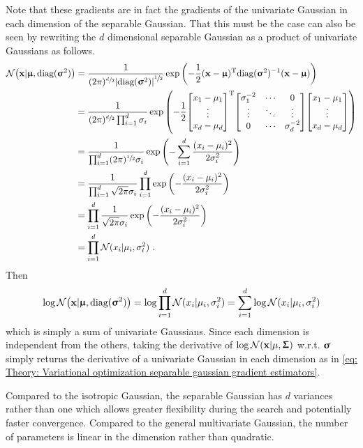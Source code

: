 Note that these gradients are in fact the gradients of the univariate Gaussian in each dimension of the separable Gaussian. That this must be the case can also be seen by rewriting the $d$ dimensional separable Gaussian as a product of univariate Gaussians as follows.
\begin{align}
    \mathcal{N}{\left({\mathbf{x}}|{\boldsymbol{\upmu}}, \text{diag}({\boldsymbol{\upsigma}}^2)\right)}
    &= \frac{1}{(2\pi)^{\sfrac{d}{2}}{\left\lvert\text{diag}({\boldsymbol{\upsigma}}^2)\right\rvert}^{\sfrac{1}{2}}}\exp{\left(-\frac{1}{2}({\mathbf{x}}-{\boldsymbol{\upmu}}){^\mathrm{T}}\text{diag}({\boldsymbol{\upsigma}}^2)^{-1}({\mathbf{x}}-{\boldsymbol{\upmu}})\right)}\nonumber\\
    &= \frac{1}{(2\pi)^{\sfrac{d}{2}}\prod_{i=1}^d \sigma_i}\exp{\left(-\frac{1}{2} 
    {\begin{bmatrix}x_1-\mu_1\\\vdots\\x_d-\mu_d\end{bmatrix}}^\text{T}
    {\begin{bmatrix}\sigma_1^{-2} & \cdots & 0\\
          \vdots        & \ddots & \vdots\\
          0             & \cdots & \sigma_d^{-2}\end{bmatrix}}
    {\begin{bmatrix}x_1-\mu_1\\\vdots\\x_d-\mu_d\end{bmatrix}}\right)}\nonumber\\
    &= \frac{1}{\prod_{i=1}^d (2\pi)^{\sfrac{1}{2}}\sigma_i}\exp{\left(-\sum_{i=1}^d\frac{(x_i-\mu_i)^2}{2\sigma_i^2}\right)}\nonumber\\
    &= \frac{1}{\prod_{i=1}^d \sqrt{2\pi}\sigma_i}\prod_{i=1}^d\exp{\left(-\frac{(x_i-\mu_i)^2}{2\sigma_i^2}\right)} \nonumber\\
    &= \prod_{i=1}^d\frac{1}{\sqrt{2\pi}\sigma_i}\exp{\left(-\frac{(x_i-\mu_i)^2}{2\sigma_i^2}\right)}\nonumber\\
    &= \prod_{i=1}^d\mathcal{N}(x_i|\mu_i,\sigma_i^2) \ .
\end{align}
Then
\begin{equation}
    \log\mathcal{N}{\left({\mathbf{x}}|{\boldsymbol{\upmu}}, \text{diag}({\boldsymbol{\upsigma}}^2)\right)} = \log\prod_{i=1}^d\mathcal{N}(x_i|\mu_i,\sigma_i^2) = \sum_{i=1}^d \log\mathcal{N}(x_i|\mu_i,\sigma_i^2)
\end{equation}
which is simply a sum of univariate Gaussians. Since each dimension is independent from the others, taking the derivative of $\log\mathcal{N}{\left({\mathbf{x}}|\mu, {\boldsymbol{\Upsigma}}\right)}$ w.r.t. ${\boldsymbol{\upsigma}}$ simply returns the derivative of a univariate Gaussian in each dimension as in \eqref{eq: Theory: Variational optimization separable gaussian gradient estimators}.

Compared to the isotropic Gaussian, the separable Gaussian has $d$ variances rather than one which allows greater flexibility during the search and potentially faster convergence. Compared to the general multivariate Gaussian, the number of parameters is linear in the dimension rather than quadratic. 

